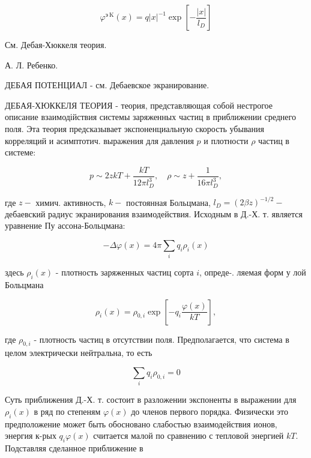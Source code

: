 \documentclass[10pt]{article}
\begin{document}
\[

\varphi^{э \mathrm{~K}}(x)=q|x|^{-1} \exp \left[-\frac{|x|}{l_{D}}\right]

\]



См. Дебая-Хюккеля теория.



А. Л. Ребенко.



ДЕБАЯ ПОТЕНЦИАЛ - см. Дебаевское экранирование.



ДЕБАЯ-ХЮККЕЛЯ ТЕОРИЯ - теория, представляющая собой нестрогое описание взаимодійствия системы заряженных частиц в приближении среднего поля. Эта теория предсказывает экспоненциальную скорость убывания корреляций и асимптотич. выражения для давления $p$ и плотности $\rho$ частиц в системе:



\[

p \sim 2 z k T+\frac{k T}{12 \pi l_{D}^{3}}, \quad \rho \sim z+\frac{1}{16 \pi l_{D}^{3}},

\]



где $z-$ химич. активность, $k-$ постоянная Больцмана, $l_{D}=(2 \beta z)^{-1 / 2}-$ дебаевский радиус экранирования взаимодействия. Исходным в Д.-Х. т. является уравнение Пу ассона-Больцмана:



\[

-\Delta \varphi(x)=4 \pi \sum_{i} q_{i} \rho_{i}(x)

\]



здесь $\rho_{i}(x)$ - плотность заряженных частиц сорта $i$, опреде-. ляемая форм у лой Больцмана



\[

\rho_{i}(x)=\rho_{0, i} \exp \left[-q_{i} \frac{\varphi(x)}{k T}\right],

\]



где $\rho_{0, i}$ - плотность частиц в отсутствии поля. Предполагается, что система в целом электрически нейтральна, то есть



\[

\sum_{i} q_{i} \rho_{0, i}=0

\]



Суть приближения Д.-Х. т. состоит в разложении экспоненты в выражении для $\rho_{i}(x)$ в ряд по степеням $\varphi(x)$ до членов первого порядка. Физически это предположение может быть обосновано слабостью взаимодействия ионов, энергия к-рых $q_{i} \varphi(x)$ считается малой по сравнению с тепловой энергией $k T$. Подставляя сделанное приближение в
\end{document}

